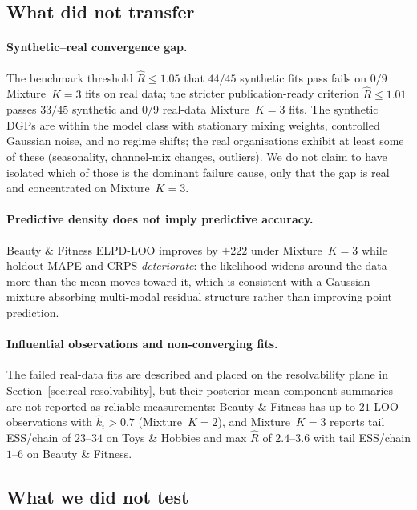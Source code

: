 \documentclass[11pt]{article}
\begin{document}
\subsection{What did not transfer}

\paragraph{Synthetic--real convergence gap.} The benchmark threshold $\widehat{R} \le 1.05$ that $44/45$ synthetic fits pass fails on $0/9$ Mixture~$K=3$ fits on real data; the stricter publication-ready criterion $\widehat{R} \le 1.01$ passes $33/45$ synthetic and $0/9$ real-data Mixture~$K=3$ fits. The synthetic DGPs are within the model class with stationary mixing weights, controlled Gaussian noise, and no regime shifts; the real organisations exhibit at least some of these (seasonality, channel-mix changes, outliers). We do not claim to have isolated which of those is the dominant failure cause, only that the gap is real and concentrated on Mixture~$K=3$.

\paragraph{Predictive density does not imply predictive accuracy.} Beauty \& Fitness ELPD-LOO improves by $+222$ under Mixture~$K=3$ while holdout MAPE and CRPS \emph{deteriorate}: the likelihood widens around the data more than the mean moves toward it, which is consistent with a Gaussian-mixture absorbing multi-modal residual structure rather than improving point prediction.

\paragraph{Influential observations and non-converging fits.} The failed real-data fits are described and placed on the resolvability plane in Section~\ref{sec:real-resolvability}, but their posterior-mean component summaries are not reported as reliable measurements: Beauty \& Fitness has up to $21$ LOO observations with $\hat k_i > 0.7$ (Mixture~$K=2$), and Mixture~$K=3$ reports tail ESS/chain of $23$--$34$ on Toys \& Hobbies and max $\widehat{R}$ of $2.4$--$3.6$ with tail ESS/chain $1$--$6$ on Beauty \& Fitness.

\subsection{What we did not test}
\end{document}
